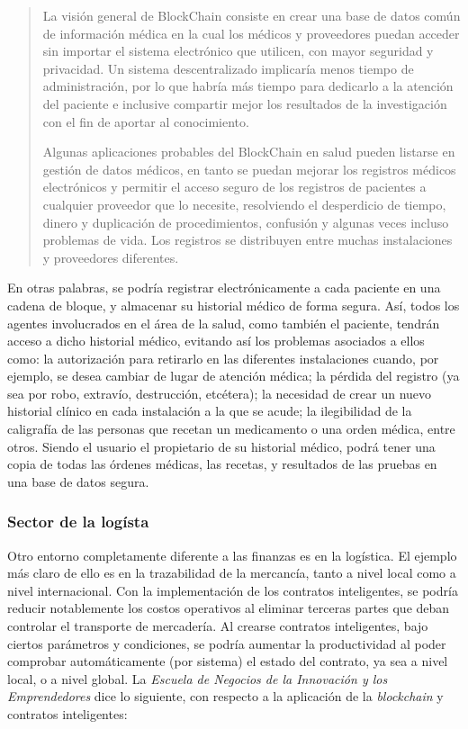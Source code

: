\documentclass[12pt,a4paper,twoside]{book}
\begin{document}
\begin{quotation}
La visión general de BlockChain consiste en crear una base de datos común de información médica en la cual los médicos y proveedores puedan acceder sin importar el sistema electrónico que utilicen, con mayor seguridad y privacidad. Un sistema descentralizado implicaría menos tiempo de administración, por lo que habría más tiempo para dedicarlo a la atención del paciente e inclusive compartir mejor los resultados de la investigación con el fin de aportar al conocimiento.

Algunas aplicaciones probables del BlockChain en salud pueden listarse en gestión de datos médicos, en tanto se puedan mejorar los registros médicos electrónicos y permitir el acceso seguro de los registros de pacientes a cualquier proveedor que lo necesite, resolviendo el desperdicio de tiempo, dinero y duplicación de procedimientos, confusión y algunas veces incluso problemas de vida. Los registros se distribuyen entre muchas instalaciones y proveedores diferentes. \cite{blockchain:medicina}
\end{quotation}

En otras palabras, se podría registrar electrónicamente a cada paciente en una cadena de bloque, y almacenar su historial médico de forma segura. Así, todos los agentes involucrados en el área de la salud, como también el paciente, tendrán acceso a dicho historial médico, evitando así los problemas asociados a ellos como: la autorización para retirarlo en las diferentes instalaciones cuando, por ejemplo, se desea cambiar de lugar de atención médica; la pérdida del registro (ya sea por robo, extravío, destrucción, etcétera); la necesidad de crear un nuevo historial clínico en cada instalación a la que se acude; la ilegibilidad de la caligrafía de las personas que recetan un medicamento o una orden médica, entre otros. Siendo el usuario el propietario de su historial médico, podrá tener una copia de todas las órdenes médicas, las recetas, y resultados de las pruebas en una base de datos segura.

\subsubsection{Sector de la logísta}
Otro entorno completamente diferente a las finanzas es en la logística. El ejemplo más claro de ello es en la trazabilidad de la mercancía, tanto a nivel local como a nivel internacional. Con la implementación de los contratos inteligentes, se podría reducir notablemente los costos operativos al eliminar terceras partes que deban controlar el transporte de mercadería. Al crearse contratos inteligentes, bajo ciertos parámetros y condiciones, se podría aumentar la productividad al poder comprobar automáticamente (por sistema) el estado del contrato, ya sea a nivel local, o a nivel global. La \textit{Escuela de Negocios de la Innovación y los Emprendedores} dice lo siguiente, con respecto a la aplicación de la \textit{blockchain} y contratos inteligentes:
\end{document}

